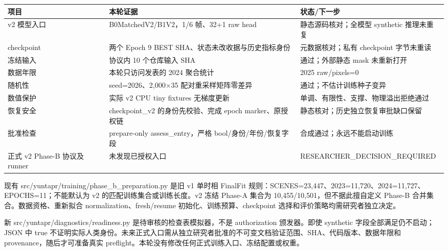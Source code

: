 \documentclass[UTF8,a4paper,10pt,fontset=fandol]{ctexart}
\begin{document}
\begin{center}\scriptsize\begin{longtable}{@{}p{\dimexpr(\linewidth-4\tabcolsep)/3\relax}p{\dimexpr(\linewidth-4\tabcolsep)/3\relax}p{\dimexpr(\linewidth-4\tabcolsep)/3\relax}@{}}\toprule
项目 & 本轮证据 & 状态/下一步\\
\midrule\endhead
v2 模型入口 & B0MatchedV2/B1V2，1/6 帧、32+1 raw head & 静态源码核对；全模型 synthetic 推理未重复\\
checkpoint & 两个 Epoch 9 BEST SHA、状态未改收据与历史指标身份 & 元数据核对；私有 checkpoint 字节未重读\\
冻结输入 & 协议内 10 个仓库输入 SHA & 通过；外部静态 mask 未重新打开\\
数据年限 & 本轮只访问发表的 2024 聚合统计 & 2025 raw/pixels=0\\
随机性 & seed=2026、2,000×35 配对重采样矩阵零差异 & 通过；不估计训练种子变异\\
数值保护 & 实际 v2 CPU tiny fixtures 无梯度更新 & 单调、有限性、支撑、物理溢出拒绝通过\\
恢复安全 & checkpoint\_\allowbreak{}v2 的身份先校验、完成 epoch marker、原授权链 & 静态核对；历史独立恢复审批缺口保留\\
批准检查 & prepare-only assess\_\allowbreak{}entry，严格 bool/身份/年份/恢复字段 & 合成通过；永远不能启动训练\\
正式 v2 Phase-B 协议及 runner & 未发现已授权入口 & RESEARCHER\_\allowbreak{}DECISION\_\allowbreak{}REQUIRED\\
\bottomrule\end{longtable}\end{center}\normalsize

现有 src/yuntapr/training/phase\_\allowbreak{}b\_\allowbreak{}preparation.py 是旧 v1 单时相 FinalFit 规则：SCENES=23,447、2023=11,720、2024=11,727、EPOCHS=11；不能默认为 v2 的匹配训练集合或训练长度。v2 冻结 Phase-A 集合为 10,455/10,501，但不据此擅自定义 Phase-B 合并集合。数据资格、重新拟合 normalization、fresh/resume 初始化、训练预算、checkpoint 选择和评价策略均需研究者独立决定。\par

新 src/yuntapr/diagnostics/readiness.py 是待审核的检查表模拟器，不是 authorization 颁发器。即使 synthetic 字段全部满足仍不启动；JSON 中 true 不证明实际人类身份。未来正式入口需从独立研究者批准的不可变文档验证范围、SHA、代码版本、数据年限和 provenance，随后才可准备真实 preflight。本轮没有修改任何正式训练入口、冻结配置或权重。\par
\end{document}
